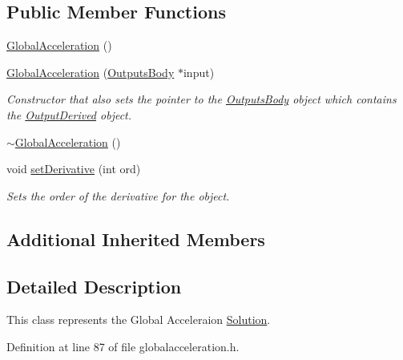 \subsection*{Public Member Functions}
\begin{DoxyCompactItemize}
\item 
\hyperlink{classosea_1_1ofreq_1_1_global_acceleration_a37a05fcecd06641847388428a3f43fb8}{Global\-Acceleration} ()
\item 
\hyperlink{classosea_1_1ofreq_1_1_global_acceleration_acf5cd2816897a20982767248ae88ed07}{Global\-Acceleration} (\hyperlink{classosea_1_1ofreq_1_1_outputs_body}{Outputs\-Body} $\ast$input)
\begin{DoxyCompactList}\small\item\em Constructor that also sets the pointer to the \hyperlink{classosea_1_1ofreq_1_1_outputs_body}{Outputs\-Body} object which contains the \hyperlink{classosea_1_1ofreq_1_1_output_derived}{Output\-Derived} object. \end{DoxyCompactList}\item 
\hyperlink{classosea_1_1ofreq_1_1_global_acceleration_aafb7853a1923f0e06b96f2ef4eca03d3}{$\sim$\-Global\-Acceleration} ()
\item 
void \hyperlink{classosea_1_1ofreq_1_1_global_acceleration_a14a041ea42d4c1bc10211c9a44aa3431}{set\-Derivative} (int ord)
\begin{DoxyCompactList}\small\item\em Sets the order of the derivative for the object. \end{DoxyCompactList}\end{DoxyCompactItemize}
\subsection*{Additional Inherited Members}


\subsection{Detailed Description}
This class represents the Global Acceleraion \hyperlink{classosea_1_1ofreq_1_1_solution}{Solution}. 

Definition at line 87 of file globalacceleration.\-h.



